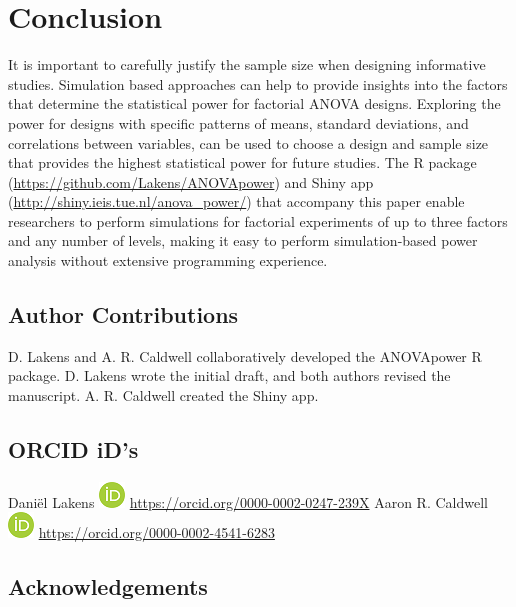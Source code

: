 \documentclass[,jou,floatsintext]{apa6}
\begin{document}
\hypertarget{conclusion}{%
\section{Conclusion}\label{conclusion}}

It is important to carefully justify the sample size when designing informative studies.
Simulation based approaches can help to provide insights into the factors that determine the statistical power for factorial ANOVA designs.
Exploring the power for designs with specific patterns of means, standard deviations, and correlations between variables, can be used to choose a design and sample size that provides the highest statistical power for future studies. The R package (\url{https://github.com/Lakens/ANOVApower}) and Shiny app (\url{http://shiny.ieis.tue.nl/anova_power/}) that accompany this paper enable researchers to perform simulations for factorial experiments of up to three factors and any number of levels, making it easy to perform simulation-based power analysis without extensive programming experience.

\hypertarget{author-contributions}{%
\subsection{Author Contributions}\label{author-contributions}}

D. Lakens and A. R. Caldwell collaboratively developed the ANOVApower R package. D. Lakens wrote the initial draft, and both authors revised the manuscript. A. R. Caldwell created the Shiny app.

\hypertarget{orcid-ids}{%
\subsection{ORCID iD's}\label{orcid-ids}}

Daniël Lakens \includegraphics{screenshots/orcid.png} \url{https://orcid.org/0000-0002-0247-239X}
Aaron R. Caldwell \includegraphics{screenshots/orcid.png} \url{https://orcid.org/0000-0002-4541-6283}

\hypertarget{acknowledgements}{%
\subsection{Acknowledgements}\label{acknowledgements}}
\end{document}
